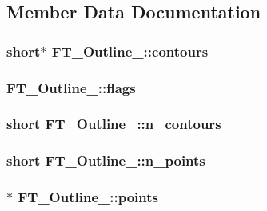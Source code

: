 \subsection{Member Data Documentation}
\hypertarget{struct_f_t___outline___a218fdea14003061142ac1045ac50affa}{
\subsubsection[{contours}]{\setlength{\rightskip}{0pt plus 5cm}short$\ast$ F\-T\-\_\-\-Outline\-\_\-\-::contours}}\label{struct_f_t___outline___a218fdea14003061142ac1045ac50affa}
\hypertarget{struct_f_t___outline___a149765f0be0eab4fc82410cf853964bf}{
\subsubsection[{flags}]{ F\-T\-\_\-\-Outline\-\_\-\-::flags}}\label{struct_f_t___outline___a149765f0be0eab4fc82410cf853964bf}
\hypertarget{struct_f_t___outline___a0313ba9c2c51f10e6b7d7ef97bd946e2}{
\subsubsection[{n\-\_\-contours}]{\setlength{\rightskip}{0pt plus 5cm}short F\-T\-\_\-\-Outline\-\_\-\-::n\-\_\-contours}}\label{struct_f_t___outline___a0313ba9c2c51f10e6b7d7ef97bd946e2}
\hypertarget{struct_f_t___outline___a7ebcf3c33231af88655534d1ac02b66e}{
\subsubsection[{n\-\_\-points}]{\setlength{\rightskip}{0pt plus 5cm}short F\-T\-\_\-\-Outline\-\_\-\-::n\-\_\-points}}\label{struct_f_t___outline___a7ebcf3c33231af88655534d1ac02b66e}
\hypertarget{struct_f_t___outline___a4871896a2f38bdab947e30a7cf6bca04}{
\subsubsection[{points}]{$\ast$ F\-T\-\_\-\-Outline\-\_\-\-::points}}\label{struct_f_t___outline___a4871896a2f38bdab947e30a7cf6bca04}
